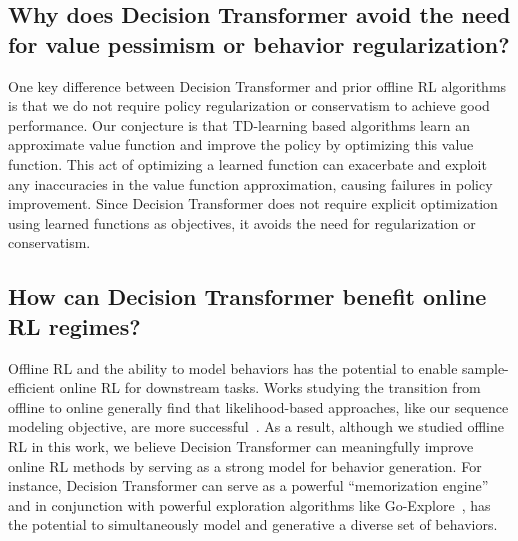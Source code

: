 \subsection{Why does Decision Transformer avoid the need for value pessimism or behavior regularization?}

One key difference between Decision Transformer and prior offline RL algorithms is that we do not require policy regularization or conservatism to achieve good performance.
Our conjecture is that TD-learning based algorithms learn an approximate value function and improve the policy by optimizing this value function.
This act of optimizing a learned function can exacerbate and exploit any inaccuracies in the value function approximation, causing failures in policy improvement.
Since Decision Transformer does not require explicit optimization using learned functions as objectives, it avoids the need for regularization or conservatism.

\subsection{How can Decision Transformer benefit online RL regimes?}

Offline RL and the ability to model behaviors has the potential to enable sample-efficient online RL for downstream tasks.
Works studying the transition from offline to online generally find that likelihood-based approaches, like our sequence modeling objective, are more successful~\citep{gao2018normalizedpg, nair2020awac}.
As a result, although we studied offline RL in this work, we believe Decision Transformer can meaningfully improve online RL methods by serving as a strong model for behavior generation. For instance, Decision Transformer can serve as a powerful ``memorization engine'' and in conjunction with powerful exploration algorithms like Go-Explore~\cite{ecoffet2019goexplore}, has the potential to simultaneously model and generative a diverse set of behaviors.
